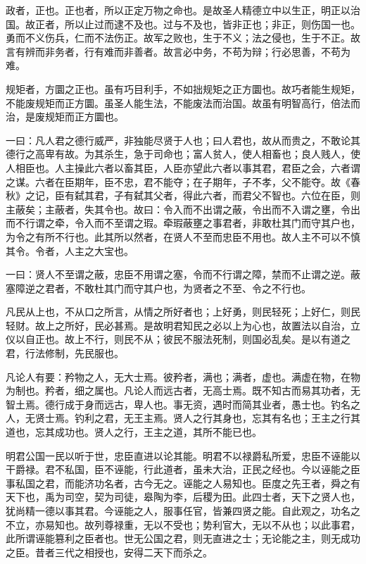 \documentclass[]{article}
\begin{document}
政者，正也。正也者，所以正定万物之命也。是故圣人精德立中以生正，明正以治国。故正者，所以止过而逮不及也。过与不及也，皆非正也；非正，则伤国一也。勇而不义伤兵，仁而不法伤正。故军之败也，生于不义；法之侵也，生于不正。故言有辨而非务者，行有难而非善者。故言必中务，不苟为辩；行必思善，不苟为难。

规矩者，方圜之正也。虽有巧目利手，不如拙规矩之正方圜也。故巧者能生规矩，不能废规矩而正方圜。虽圣人能生法，不能废法而治国。故虽有明智高行，倍法而治，是废规矩而正方圜也。

一曰：凡人君之德行威严，非独能尽贤于人也；曰人君也，故从而贵之，不敢论其德行之高卑有故。为其杀生，急于司命也；富人贫人，使人相畜也；良人贱人，使人相臣也。人主操此六者以畜其臣，人臣亦望此六者以事其君，君臣之会，六者谓之谋。六者在臣期年，臣不忠，君不能夺；在子期年，子不孝，父不能夺。故《春秋》之记，臣有弑其君，子有弑其父者，得此六者，而君父不智也。六位在臣，则主蔽矣；主蔽者，失其令也。故曰：令入而不出谓之蔽，令出而不入谓之壅，令出而不行谓之牵，令入而不至谓之瑕。牵瑕蔽壅之事君者，非敢杜其门而守其户也，为令之有所不行也。此其所以然者，在贤人不至而忠臣不用也。故人主不可以不慎其令。令者，人主之大宝也。

一曰：贤人不至谓之蔽，忠臣不用谓之塞，令而不行谓之障，禁而不止谓之逆。蔽塞障逆之君者，不敢杜其门而守其户也，为贤者之不至、令之不行也。

凡民从上也，不从口之所言，从情之所好者也；上好勇，则民轻死；上好仁，则民轻财。故上之所好，民必甚焉。是故明君知民之必以上为心也，故置法以自治，立仪以自正也。故上不行，则民不从；彼民不服法死制，则国必乱矣。是以有道之君，行法修制，先民服也。

凡论人有要：矜物之人，无大士焉。彼矜者，满也；满者，虚也。满虚在物，在物为制也。矜者，细之属也。凡论人而远古者，无高士焉。既不知古而易其功者，无智土焉。德行成于身而远古，卑人也。事无资，遇时而简其业者，愚士也。钓名之人，无贤士焉。钓利之君，无王主焉。贤人之行其身也，忘其有名也；王主之行其道也，忘其成功也。贤人之行，王主之道，其所不能已也。

明君公国一民以听于世，忠臣直进以论其能。明君不以禄爵私所爱，忠臣不诬能以干爵禄。君不私国，臣不诬能，行此道者，虽未大治，正民之经也。今以诬能之臣事私国之君，而能济功名者，古今无之。诬能之人易知也。臣度之先王者，舜之有天下也，禹为司空，契为司徒，皋陶为李，后稷为田。此四士者，天下之贤人也，犹尚精一德以事其君。今诬能之人，服事任官，皆兼四贤之能。自此观之，功名之不立，亦易知也。故列尊禄重，无以不受也；势利官大，无以不从也；以此事君，此所谓诬能篡利之臣者也。世无公国之君，则无直进之士；无论能之主，则无成功之臣。昔者三代之相授也，安得二天下而杀之。
\end{document}
